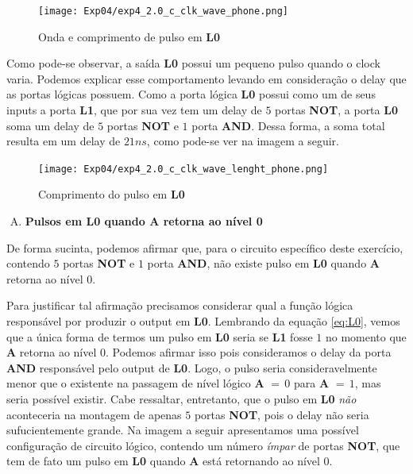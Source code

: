 \documentclass[12pt]{article}
\begin{document}
\begin{figure}[H]
    \centering
    \texttt{[image: Exp04/exp4\_2.0\_c\_clk\_wave\_phone.png]}
    \caption{Onda e comprimento de pulso em \textbf{L0}}\label{fig:exp4_2.0_c_clk_wave_phone.png}
\end{figure}

Como pode-se observar, a saída \textbf{L0} possui um pequeno pulso quando o
clock varia. Podemos explicar esse comportamento levando em consideração o delay
que as portas lógicas possuem. Como a porta lógica \textbf{L0} possui como um de
seus inputs a porta \textbf{L1}, que por sua vez tem um delay de $5$ portas
\textbf{NOT}, a porta \textbf{L0} soma um delay de $5$ portas \textbf{NOT} e $1$
porta \textbf{AND}. Dessa forma, a soma total resulta em um delay de $21ns$,
como pode-se ver na imagem a seguir.

\begin{figure}[H]
    \centering
    \texttt{[image: Exp04/exp4\_2.0\_c\_clk\_wave\_lenght\_phone.png]}
    \caption{Comprimento do pulso em \textbf{L0}}\label{fig:exp4_2.0_c_clk_wave_lenght_phone.png}
\end{figure}

\begin{enumerate}[D)]
\item \textbf{Pulsos em L0 quando A retorna ao nível 0}
\end{enumerate}

De forma sucinta, podemos afirmar que, para o circuito específico deste
exercício, contendo $5$ portas \textbf{NOT} e $1$ porta \textbf{AND}, não existe
pulso em \textbf{L0} quando \textbf{A} retorna ao nível $0$.

Para justificar tal afirmação precisamos considerar qual a função lógica
responsável por produzir o output em \textbf{L0}. Lembrando da equação
\ref{eq:L0}, vemos que a única forma de termos um pulso em \textbf{L0} seria se
\textbf{L1} fosse $1$ no momento que \textbf{A} retorna ao nível $0$. Podemos
afirmar isso pois consideramos o delay da porta \textbf{AND} responsável pelo
output de \textbf{L0}. Logo, o pulso seria consideravelmente menor que o
existente na passagem de nível lógico \textbf{A} $= \, 0$ para \textbf{A}
$= \, 1$, mas seria possível existir. Cabe ressaltar, entretanto, que o pulso em
\textbf{L0} \emph{não} aconteceria na montagem de apenas $5$ portas
\textbf{NOT}, pois o delay não seria sufucientemente grande. Na imagem a seguir
apresentamos uma possível configuração de circuito lógico, contendo um número
\emph{ímpar} de portas \textbf{NOT}, que tem de fato um pulso em \textbf{L0}
quando \textbf{A} está retornando ao nível $0$.
\end{document}
